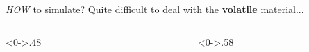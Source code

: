 \documentclass[handout,t]{beamer}
\begin{document}
\begin{frame}[t]{\emph{HOW} to simulate?}
  \textcolor[rgb]{0.5,0.5,0.5}{Quite difficult to deal with the \textbf{\color{blue}volatile} material...}
  \begin{columns} %
    \begin{column}<0->{.48\textwidth}
      \begin{figure}[thpb]
        \centering
        \label{fig:system}
      \end{figure}
    \end{column}%
    \hfill%
    \begin{column}<0->{.58\textwidth}
      \\
      \begin{itemize}

\end{itemize}
\end{column}
\end{columns}
\end{frame}
\end{document}
